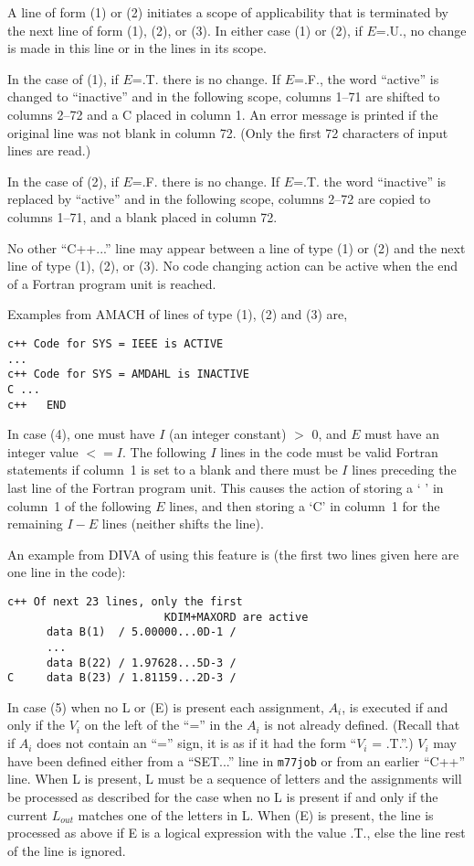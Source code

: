 \documentclass[twoside]{MATH77}
\begin{document}
A line of form (1) or (2) initiates a scope of applicability that is
terminated by the next line of form (1), (2), or (3).  In either case
(1) or (2), if $E$=.U., no change is made in this line or in the
lines in its scope.

In the case of (1), if $E$=.T. there is no change.  If $E$=.F.,
the word ``active'' is changed to ``inactive'' and in the following
scope, columns 1--71 are shifted to columns 2--72 and a C placed in
column 1.  An error message is printed if the original line was not
blank in column 72.  (Only the first 72 characters of input lines are
read.)

In the case of (2), if $E$=.F. there is no change.  If $E$=.T. the
word ``inactive'' is replaced by ``active'' and in the following
scope, columns 2--72 are copied to columns 1--71, and a blank placed
in column 72.

No other ``C++...'' line may appear between a line of type (1) or (2)
and the next line of type (1), (2), or (3).  No code changing action
can be active when the end of a Fortran program unit is reached.

Examples from AMACH of lines of type (1), (2) and (3) are,

\begin{verbatim}
c++ Code for SYS = IEEE is ACTIVE
...
c++ Code for SYS = AMDAHL is INACTIVE
C ...
c++   END
\end{verbatim}

In case (4), one must have $I$ (an integer constant) $>$ 0, and $E$
must have an integer value $ <= I$.  The following $I$ lines in the
code must be valid Fortran statements if column~1 is set to a blank
and there must be $I$ lines preceding the last line of the Fortran
program unit. This causes the action of storing a ` ' in column~1 of
the following $E$ lines, and then storing a `C' in column~1 for the
remaining $I - E$ lines (neither shifts the line).

An example from DIVA of using this feature is (the first two lines
given here are one line in the code):

\begin{verbatim}
c++ Of next 23 lines, only the first
                        KDIM+MAXORD are active
      data B(1)  / 5.00000...0D-1 /
      ...
      data B(22) / 1.97628...5D-3 /
C     data B(23) / 1.81159...2D-3 /
\end{verbatim}

In case (5) when no L or (E) is present each assignment, $A_i$, is
executed if and only if the $V_i$ on the left of the ``='' in the $A_i$ is
not already defined.  (Recall that if $A_i$ does not contain an ``=''
sign, it is as if it had the form ``$V_i$ = .T.''.)  $V_i$ may have been
defined either from a ``SET...'' line in {\tt m77job} or from an
earlier ``C++'' line.  When L is present, L must be a sequence of
letters and the assignments will be processed as described for the
case when no L is present if and only if the current $L_{out}$ matches
one of the letters in L.  When (E) is present, the line is processed as
above if E is a logical expression with the value .T., else the line rest
of the line is ignored.
\end{document}
